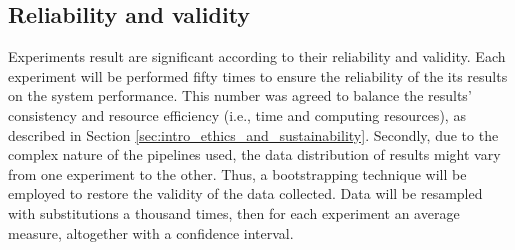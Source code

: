 \subsection{Reliability and validity}
\label{subsec:method_reliability_validity}

Experiments result are significant according to their reliability and validity. Each experiment will be performed fifty times to ensure the reliability of the its results on the system performance. This number was agreed to balance the results' consistency and resource efficiency (i.e., time and computing resources), as described in Section \ref{sec:intro_ethics_and_sustainability}. Secondly, due to the complex nature of the pipelines used, the data distribution of results might vary from one experiment to the other. Thus, a bootstrapping technique will be employed to restore the validity of the data collected. Data will be resampled with substitutions a thousand times, then for each experiment an average measure, altogether with a confidence interval.